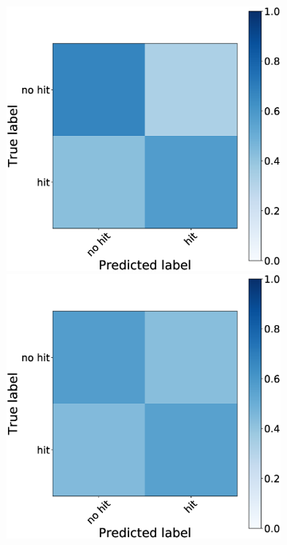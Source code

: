 \documentclass[journal]{IEEEtran}
\begin{document}
{{\begin{figure}[h!]
\begin{subfigure}{0.5\textwidth}
\includegraphics[scale=0.14]{revisedimages/matrix_3.eps}
\includegraphics[scale=0.14]{revisedimages/matrix_4.eps}\\

\end{subfigure}
\end{figure}}}
\end{document}
